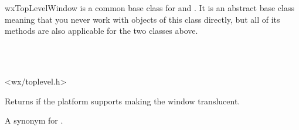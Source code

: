 
\section{}\label{wxtoplevelwindow}

wxTopLevelWindow is a common base class for  and
. It is an abstract base class meaning that you never
work with objects of this class directly, but all of its methods are also
applicable for the two classes above.


\\
\\


<wx/toplevel.h>





\label{wxtoplevelwindowcansettransparent}


Returns \true if the platform supports making the window translucent.




\label{wxtoplevelwindowcenteronscreen}


A synonym for .


\label{wxtoplevelwindowcentreonscreen}

